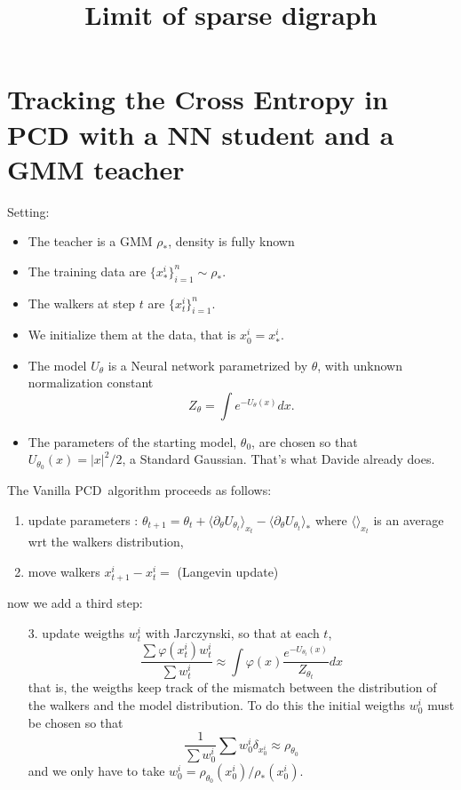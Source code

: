 \documentclass[a4paper,11pt]{extarticle}
\title{Limit of sparse digraph}
\author{}
\date{}
\begin{document}
\section*{Tracking the Cross Entropy in PCD with a NN student and a GMM teacher}

Setting: 
\begin{itemize}
\item The teacher is a GMM $\rho_*$, density is fully known
\item The training data are $\{x_*^i\}_{i=1}^n \sim \rho_*$. 
\item The walkers at step $t$ are $\{x^i_t\}_{i=1}^n$. 
\item We initialize them at the data, that is $x^i_0 = x^i_*$. 
\item The model $U_\theta$ is a Neural network parametrized by $\theta$, with unknown normalization constant 
$$Z_\theta = \int e^{-U_\theta(x)}dx.$$
\item The parameters of the starting model, $\theta_0$, are chosen so that $U_{\theta_0}(x) = |x|^2/2$, a Standard Gaussian. That's what Davide already does. 
\end{itemize}

The Vanilla PCD algorithm proceeds as follows: 

\begin{enumerate}
    \item update parameters : $\theta_{t+1} = \theta_t + \langle \partial_\theta U_{\theta_t} \rangle_{x_t} - \langle \partial_\theta U_{\theta_t}\rangle_*$ where $\langle \rangle_{x_t}$ is an average wrt the walkers distribution, 
    \item move walkers $x^i_{t+1} - x^i_t = $ (Langevin update)
\end{enumerate}
now we add a third step: 
\begin{enumerate}
    \item[3.] update weigths $w_t^i$ with Jarczynski, so that at each $t$, 
    \begin{equation}\frac{\sum \varphi(x_t^i)w^i_t}{\sum w^i_t} \approx \int \varphi(x)\frac{e^{-U_{\theta_t}(x)}}{Z_{\theta_t}}dx\end{equation}
    that is, the weigths keep track of the mismatch between the distribution of the walkers and the model distribution. To do this the initial weigths $w_0^i$ must be chosen so that 
    \begin{equation}\frac{1}{\sum w_0^i}\sum w_0^i \delta_{x_0^i} \approx \rho_{\theta_0}\end{equation}
    and we only have to take $w_0^i = \rho_{\theta_0}(x_0^i) / \rho_*(x_0^i)$. 
\end{enumerate}
\end{document}
